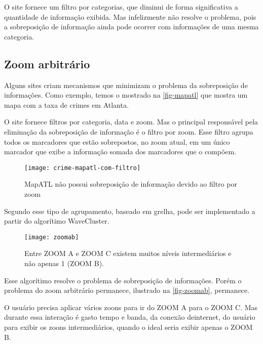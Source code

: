 O site fornece um filtro por categorias, que diminui de forma significativa a quantidade de informação exibida.  Mas infelizmente não resolve o problema, pois a sobreposição de informação ainda pode ocorrer com informações de uma mesma categoria.





\subsection{Zoom arbitrário}
Alguns sites criam mecanismos que minimizam o problema da sobreposição de informações. Como exemplo, temos o   mostrado na \autoref{fig-mapatl} que mostra um mapa com a taxa de crimes em Atlanta. 

O site fornece filtros por categoria, data e zoom. Mas o principal responsável pela eliminação da sobreposição de informação é o filtro por zoom. Esse filtro agrupa todos os marcadores que estão sobrepostos, no zoom atual, em um único marcador que exibe a informação somada dos marcadores que o compõem.
 
\begin{figure}[htb]
	\caption{\label{fig-mapatl} MapATL não possui sobreposição de informação devido ao filtro por zoom}
	\begin{center}
	    \texttt{[image: crime-mapatl-com-filtro]}
	\end{center}
\end{figure}

Segundo \cite[42,44]{silva2010solap+} esse tipo de agrupamento, baseado em grelha, pode ser implementado a partir do algorítimo WaveCluster\cite{wavecluster}. 

 

\begin{figure}[htb]
	\caption{\label{fig-zoomab} Entre ZOOM A e ZOOM C existem muitos níveis intermediários e não apenas 1 (ZOOM B).}
	\begin{center}
	    \texttt{[image: zoomab]}
	\end{center}
\end{figure}

Esse algorítimo resolve o problema de sobreposição de informações. Porém o problema do zoom arbitrário permanece, ilustrado na \autoref{fig-zoomab}, permanece.

O usuário precisa aplicar vários zoons para ir do ZOOM A para o ZOOM C. Mas durante essa interação é gasto tempo e banda, da conexão deinternet, do usuário para exibir os zoons intermediários, quando o ideal seria exibir apenas o ZOOM B.


